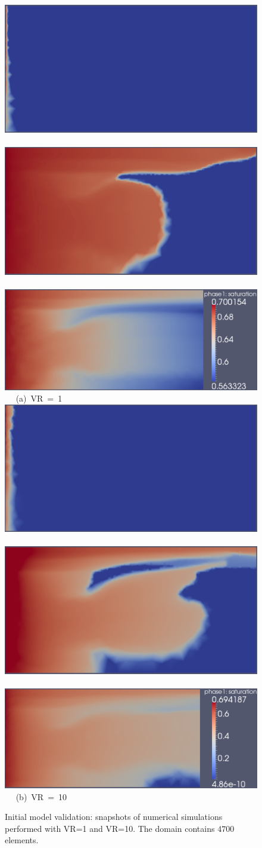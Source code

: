 \begin{landscape}
  \begin{figure}[ht]
    \vbox{ 
      \hbox{\includegraphics[width=.45\textwidth]{./Pics1/mr1_fixed/mr1_fixed_100_2.pdf}
            \includegraphics[width=.45\textwidth]{./Pics1/mr1_fixed/mr1_fixed_middle_1.pdf} 
            \includegraphics[width=.57\textwidth]{./Pics1/mr1_fixed/mr1_fixed_end_2.pdf} }
      \hbox{\hspace{8.0cm} (a) VR = 1}
      \vspace{1cm}
      \hbox{\includegraphics[width=.45\textwidth]{./Pics1/mr10_fixed/mr10_fixed_100_1.pdf}
            \includegraphics[width=.45\textwidth]{./Pics1/mr10_fixed/mr10_fixed_middle_1.pdf}
            \includegraphics[width=.57\textwidth]{./Pics1/mr10_fixed/mr10_fixed_end_2.pdf} }
      \hbox{\hspace{8.0cm} (b) VR = 10  }}
\caption{Initial model validation: snapshots of numerical simulations performed with VR=1 and VR=10. The domain contains $4700$ elements.}
\label{fem_cv_represent_vr1_vr10}
\end{figure}
\end{landscape}
\clearpage




